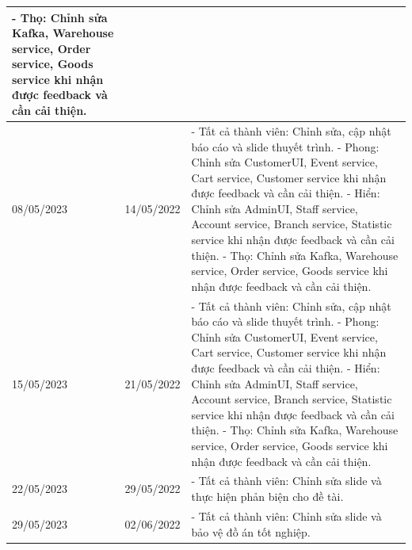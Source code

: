 {\begin{longtable}{| p{2cm} | p{2cm} | p{10cm} |}
    \newline
    - Thọ: Chỉnh sửa Kafka, Warehouse service, Order service, Goods service khi nhận được feedback và cần cải thiện. \\
	\hline
	08/05/2023 & 14/05/2022 & 
    - Tất cả thành viên: Chỉnh sửa, cập nhật báo cáo và slide thuyết trình.
    \newline
    - Phong: Chỉnh sửa CustomerUI, Event service, Cart service, Customer service khi nhận được feedback và cần cải thiện. 
    \newline
    - Hiển: Chỉnh sửa AdminUI, Staff service, Account service, Branch service, Statistic service khi nhận được feedback và cần cải thiện. 
    \newline
    - Thọ: Chỉnh sửa Kafka, Warehouse service, Order service, Goods service khi nhận được feedback và cần cải thiện. \\
	\hline
	15/05/2023 & 21/05/2022 & 
    - Tất cả thành viên: Chỉnh sửa, cập nhật báo cáo và slide thuyết trình.
    \newline
    - Phong: Chỉnh sửa CustomerUI, Event service, Cart service, Customer service khi nhận được feedback và cần cải thiện. 
    \newline
    - Hiển: Chỉnh sửa AdminUI, Staff service, Account service, Branch service, Statistic service khi nhận được feedback và cần cải thiện. 
    \newline
    - Thọ: Chỉnh sửa Kafka, Warehouse service, Order service, Goods service khi nhận được feedback và cần cải thiện. \\
	\hline
	22/05/2023 & 29/05/2022 & 
    - Tất cả thành viên: Chỉnh sửa slide và thực hiện phản biện cho đề tài. \\
	\hline
	29/05/2023 & 02/06/2022 & 
    - Tất cả thành viên: Chỉnh sửa slide và bảo vệ đồ án tốt nghiệp. \\
	\hline

\end{longtable}
}

